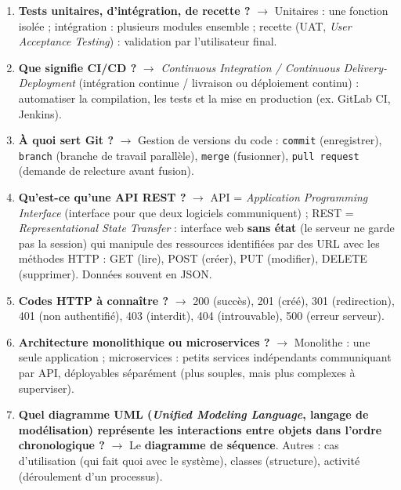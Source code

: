 \begin{enumerate}[leftmargin=*]
    \item \textbf{Tests unitaires, d'intégration, de recette ?} $\rightarrow$ Unitaires : une fonction isolée ; intégration : plusieurs modules ensemble ; recette (UAT, \textit{User Acceptance Testing}) : validation par l'utilisateur final.
    \item \textbf{Que signifie CI/CD ?} $\rightarrow$ \textit{Continuous Integration / Continuous Delivery-Deployment} (intégration continue / livraison ou déploiement continu) : automatiser la compilation, les tests et la mise en production (ex. GitLab CI, Jenkins).
    \item \textbf{À quoi sert Git ?} $\rightarrow$ Gestion de versions du code : \texttt{commit} (enregistrer), \texttt{branch} (branche de travail parallèle), \texttt{merge} (fusionner), \texttt{pull request} (demande de relecture avant fusion).
    \item \textbf{Qu'est-ce qu'une API REST ?} $\rightarrow$ API = \textit{Application Programming Interface} (interface pour que deux logiciels communiquent) ; REST = \textit{Representational State Transfer} : interface web \textbf{sans état} (le serveur ne garde pas la session) qui manipule des ressources identifiées par des URL avec les méthodes HTTP : GET (lire), POST (créer), PUT (modifier), DELETE (supprimer). Données souvent en JSON.
    \item \textbf{Codes HTTP à connaître ?} $\rightarrow$ 200 (succès), 201 (créé), 301 (redirection), 401 (non authentifié), 403 (interdit), 404 (introuvable), 500 (erreur serveur).
    \item \textbf{Architecture monolithique ou microservices ?} $\rightarrow$ Monolithe : une seule application ; microservices : petits services indépendants communiquant par API, déployables séparément (plus souples, mais plus complexes à superviser).
    \item \textbf{Quel diagramme UML (\textit{Unified Modeling Language}, langage de modélisation) représente les interactions entre objets dans l'ordre chronologique ?} $\rightarrow$ Le \textbf{diagramme de séquence}. Autres : cas d'utilisation (qui fait quoi avec le système), classes (structure), activité (déroulement d'un processus).
\end{enumerate}

